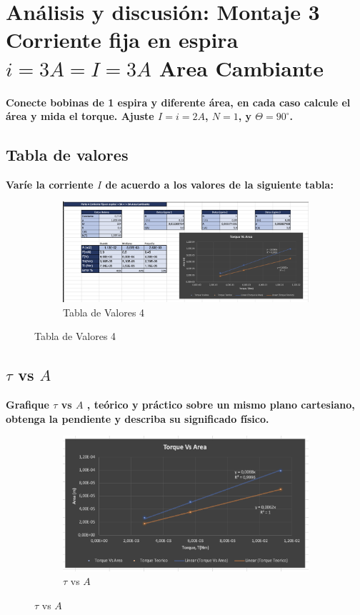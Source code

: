 \section{Análisis y discusión: Montaje 3 Corriente fija en espira $i = 3A = I = 3A$ Area Cambiante}
\textbf{Conecte bobinas de 1 espira y diferente área, en cada caso calcule el área y mida el
torque. Ajuste $I = i = 2A$, $N=1$, y $\Theta = 90^{\circ}$.}

\subsection{Tabla de valores}
\textbf{Varíe la corriente $I$ de acuerdo a los valores de la siguiente tabla:}

\begin{figure}[H]
  \centering
  \begin{subfigure}[b]{\textwidth}
      \centering
      \includegraphics[width=\textwidth]{Figures/1. Content/tabla4.png}
      \caption{Tabla de Valores 4}
      \label{fig: Tabla 4}
  \end{subfigure}
  \hfill
\end{figure}

\subsection{$\tau$ vs $A$}
\textbf{Grafique $\tau$ vs $A$ , teórico y práctico sobre un mismo plano cartesiano, obtenga la
pendiente y describa su significado físico.}

\begin{figure}[H]
  \centering
  \begin{subfigure}[b]{\textwidth}
      \centering
      \includegraphics[width=\textwidth]{Figures/1. Content/grafica4.png}
      \caption{$\tau$ vs $A$}
      \label{fig: Grafica 4}
  \end{subfigure}
  \hfill
\end{figure}

